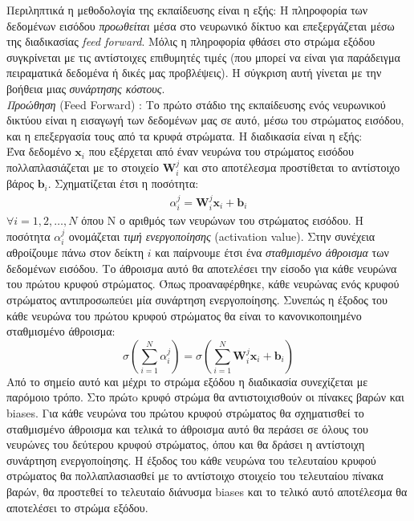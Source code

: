 \documentclass[11pt]{article} %
\numberwithin{equation}{subsection}
\begin{document}
Περιληπτικά η μεθοδολογία της εκπαίδευσης είναι η εξής: Η πληροφορία των δεδομένων εισόδου \textit{προωθείται} μέσα στο νευρωνικό δίκτυο και επεξεργάζεται μέσω της διαδικασίας \textit{feed forward}. Μόλις η πληροφορία φθάσει στο στρώμα εξόδου συγκρίνεται με τις αντίστοιχες επιθυμητές τιμές (που μπορεί να είναι για παράδειγμα πειραματικά δεδομένα ή δικές μας προβλέψεις). Η σύγκριση αυτή γίνεται με την βοήθεια μιας \textit{συνάρτησης κόστους}. \\

\textit{Προώθηση} (Feed Forward) : Το πρώτο στάδιο της εκπαίδευσης ενός νευρωνικού δικτύου είναι η εισαγωγή των δεδομένων μας σε αυτό, μέσω του στρώματος εισόδου, και η επεξεργασία τους από τα κρυφά στρώματα. Η διαδικασία είναι η εξής: \\
Ένα δεδομένο $\textbf{x}_i$ που εξέρχεται από έναν νευρώνα του στρώματος εισόδου πολλαπλασιάζεται με το στοιχείο $\textbf{W}_{i} ^j$ και στο αποτέλεσμα προστίθεται το αντίστοιχο βάρος  $\textbf{b}_i$. Σχηματίζεται έτσι η ποσότητα:
\begin{align*}
\alpha_i ^ j   =  \textbf{W}_i ^j \textbf{x}_i + \textbf{b}_i 
\end{align*}
 $\forall i = 1, 2, \dots, Ν$ όπου Ν ο αριθμός των νευρώνων του στρώματος εισόδου. Η ποσότητα $\alpha_i ^ j$ ονομάζεται \textit{τιμή ενεργοποίησης} (activation value).  Στην συνέχεια αθροίζουμε πάνω στον δείκτη $i$ και παίρνουμε έτσι ένα \textit{σταθμισμένο άθροισμα} των δεδομένων εισόδου. Το άθροισμα αυτό θα αποτελέσει την είσοδο για κάθε νευρώνα του πρώτου κρυφού στρώματος. Όπως προαναφέρθηκε, κάθε νευρώνας ενός κρυφού στρώματος αντιπροσωπεύει μία συνάρτηση ενεργοποίησης. Συνεπώς η έξοδος του κάθε νευρώνα του πρώτου κρυφού στρώματος θα είναι το {κανονικοποιημένο σταθμισμένο άθροισμα}:
\begin{equation}
\displaystyle \sigma \left( \sum_{i=1}^{N} \alpha_i ^ j \right)  =  \sigma \left(\sum_{i=1}^{N} \textbf{W}_i ^j \textbf{x}_i + \textbf{b}_i  \right)
\end{equation}
Από το σημείο αυτό και μέχρι το στρώμα εξόδου η διαδικασία συνεχίζεται με παρόμοιο τρόπο. Στο πρώτo κρυφό στρώμα θα αντιστοιχισθούν οι πίνακες βαρών και biases. Για κάθε νευρώνα του πρώτου κρυφού στρώματος θα σχηματισθεί το σταθμισμένο άθροισμα και τελικά το άθροισμα αυτό θα περάσει σε όλους του νευρώνες του δεύτερου κρυφού στρώματος, όπου και θα δράσει η αντίστοιχη συνάρτηση ενεργοποίησης. Η έξοδος του κάθε νευρώνα του τελευταίου κρυφού στρώματος θα πολλαπλασιασθεί με το αντίστοιχο στοιχείο του τελευταίου πίνακα βαρών, θα προστεθεί το τελευταίο διάνυσμα biases και το τελικό αυτό αποτέλεσμα θα αποτελέσει το στρώμα εξόδου.\\
\end{document}
